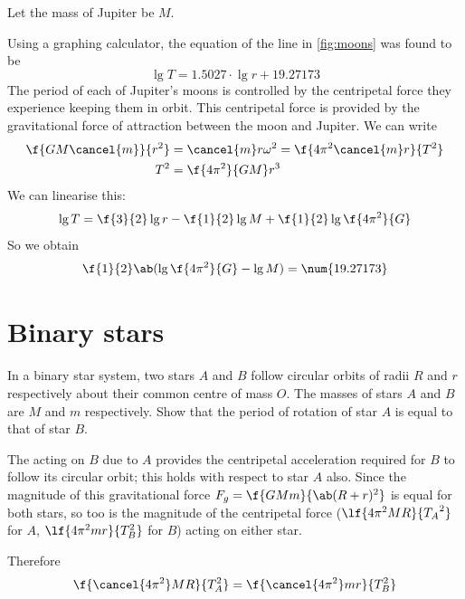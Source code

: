 Let the mass of Jupiter be \(M\).

Using a graphing calculator, the equation of the line in \cref{fig:moons} was found to be
\begin{equation}
	\label{eq:linreg}
	\lg T = \num{1.5027}\cdot\lg r + \num{19.27173}
\end{equation}
The period of each of Jupiter's moons is controlled by the centripetal
force they experience keeping them in orbit. This centripetal force is provided
by the gravitational force of attraction between the moon and Jupiter. We can write
\begin{align*}
	\f{GM\cancel{m}}{r^2} & = \cancel{m}r\omega^2 = \f{4\pi^2\cancel{m}r}{T^2} \\
	T^2                   & = \f{4\pi^2}{GM} r^3
\end{align*}
We can linearise this:
\begin{equation}
	\label{eq:linearisation}
	\lg T = \f{3}{2} \lg r - \f{1}{2}\lg{M} + \f{1}{2}\lg{\f{4\pi^2}{G}}
\end{equation}
So we obtain
\begin{align*}
	\f{1}{2}\ab(\lg{\f{4\pi^2}{G}} - \lg{M}) & = \num{19.27173} \\
\end{align*}

\section{Binary stars}
\begin{problem}
In a binary star system, two stars \(A\) and \(B\) follow
circular orbits of radii \(R\) and \(r\) respectively about their
common centre of mass \(O\). The masses of stars \(A\) and \(B\) are \(M\) and \(m\) respectively.
Show that the period of rotation of star \(A\) is equal to that of star \(B\).
\end{problem}
The  acting on \(B\) due to \(A\) provides
the centripetal acceleration required for \(B\) to follow its circular orbit; this holds with
respect to star \(A\) also.
Since the magnitude of this gravitational force \(F_g = \f{GMm}{\ab(R+r)^2}\) is equal
for both stars, so too is the magnitude of the centripetal force (\(\lf{4\pi^2 MR}{{T_A}^2}\) for \(A\), \(\lf{4\pi^2 mr}{T_B^2}\) for \(B\))
acting on either star.

Therefore
\begin{equation}
	\label{eq:equalperiod}
	\f{\cancel{4\pi^2}MR}{T_A^2} = \f{\cancel{4\pi^2}mr}{T_B^2}
\end{equation}

